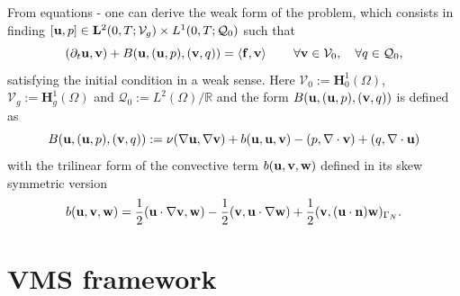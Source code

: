 From equations - one can derive the weak form of the problem, which consists in finding $[{\bf u},p]\in\mathbf{L}^2(0,T;\mathcal{V}_g)\times L^1(0,T;\mathcal{Q}_0)$ such that
\begin{equation}
\label{eq-C5_NS_weak}
(\partial_t{\bf u},{\bf v})+B({\bf u},({\bf u},p),({\bf v},q)) = \left<{\bf f},{\bf v}\right> 
\quad\quad\forall{\bf v}\in\mathcal{V}_0,\quad\forall q\in\mathcal{Q}_0,
\end{equation}
satisfying the initial condition  in a weak sense. Here $\mathcal{V}_0:=\mathbf{H}_0^1(\Omega)$, $\mathcal{V}_g:=\mathbf{H}_g^1(\Omega)$  and $\mathcal{Q}_0:=L^2(\Omega)/\mathbb{R}$ and the form $B({\bf u},({\bf u},p),({\bf v},q))$ is defined as 
\begin{equation}
\label{eq-C5_bilinear}
B({\bf u},({\bf u},p),({\bf v},q)):=\nu(\nabla{\bf u},\nabla{\bf v})+b({\bf u},{\bf u},{\bf v})-(p,\nabla\cdot{\bf v})+(q,\nabla\cdot{\bf u})
\end{equation}
with the trilinear form of the convective term $b({\bf u},{\bf v},{\bf w})$ defined in its skew symmetric version
\begin{equation}
\label{eq-C5_conv_skew}
b({\bf u},{\bf v},{\bf w})=\frac{1}{2}({\bf u}\cdot\nabla{\bf v},{\bf w})-\frac{1}{2}({\bf v},{\bf u}\cdot\nabla{\bf w})+\frac{1}{2}({\bf v},({\bf u}\cdot\mathbf{n}){\bf w})_{\Gamma_N}.
\end{equation}

\section{VMS framework}
\label{sec-C5_VMS_framework}

